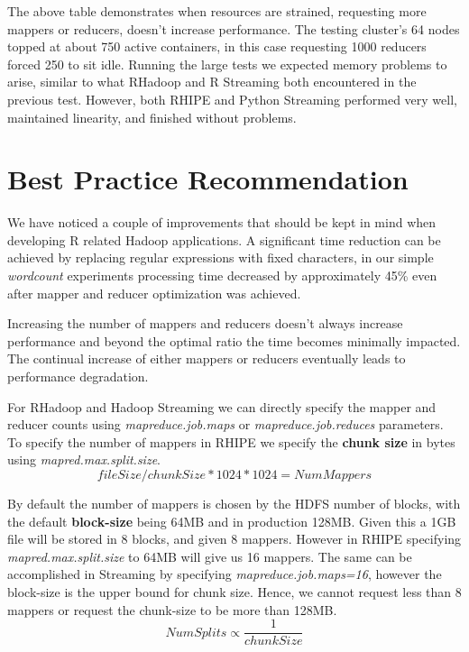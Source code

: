 \documentclass[
journal=jacsat, %
manuscript=article]{achemso}
\begin{document}
The above table demonstrates when resources are strained, requesting more mappers or reducers, doesn't increase performance. The testing cluster's 64 nodes topped at about 750 active containers, in this case requesting 1000 reducers forced 250 to sit idle. Running the large tests we expected memory problems to arise, similar to what RHadoop and R Streaming both encountered in the previous test. However, both RHIPE and Python Streaming performed very well, maintained linearity, and finished without problems. 

\section{Best Practice Recommendation}
We have noticed a couple of improvements that should be kept in mind when developing R related Hadoop applications. A significant time reduction can be achieved by replacing regular expressions with fixed characters, in our simple \textit{wordcount} experiments processing time decreased by approximately 45\% even after mapper and reducer optimization was achieved.

Increasing the number of mappers and reducers doesn’t always increase performance and beyond the optimal ratio the time becomes minimally impacted. The continual increase of either mappers or reducers eventually leads to performance degradation. 

For RHadoop and Hadoop Streaming we can directly specify the mapper and reducer counts using \textit{mapreduce.job.maps} or \textit{mapreduce.job.reduces} parameters. To specify the number of mappers in RHIPE we specify the \textbf{chunk size} in bytes using \textit{mapred.max.split.size}. 
\begin{equation}
fileSize / chunkSize * 1024 * 1024 = NumMappers \nonumber
\end{equation}

 By default the number of mappers is chosen by the HDFS number of blocks, with the default \textbf{block-size} being 64MB and in production 128MB.  Given this a 1GB file will be stored in 8 blocks, and given 8 mappers. However in RHIPE specifying \textit{mapred.max.split.size} to 64MB will give us 16 mappers.  The same can be accomplished in Streaming by specifying \textit{mapreduce.job.maps=16}, however the block-size is the upper bound for chunk size. Hence, we cannot request less than 8 mappers or request the chunk-size to be more than 128MB. 
\begin{equation}
NumSplits \propto \frac{1}{chunkSize} \nonumber
\end{equation}
\end{document}
